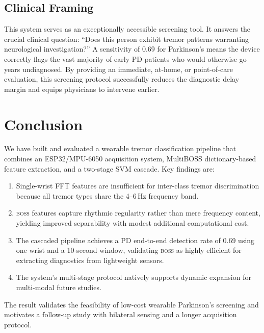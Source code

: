 \documentclass[12pt, a4paper]{article}
\newcommand{\boss}{\textsc{boss}}
\newcommand{\PD}{PD}
\begin{document}
\subsection{Clinical Framing}

This system serves as an exceptionally accessible screening tool. It answers the crucial clinical question: ``Does this person exhibit tremor patterns warranting neurological investigation?'' A sensitivity of 0.69 for Parkinson's means the device correctly flags the vast majority of early \PD{} patients who would otherwise go years undiagnosed. By providing an immediate, at-home, or point-of-care evaluation, this screening protocol successfully reduces the diagnostic delay margin and equips physicians to intervene earlier.

\section{Conclusion}
\label{sec:conclusion}

We have built and evaluated a wearable tremor classification pipeline
that combines an ESP32/MPU-6050 acquisition system, MultiBOSS
dictionary-based feature extraction, and a two-stage SVM cascade.
Key findings are:

\begin{enumerate}
  \item Single-wrist FFT features are insufficient for inter-class
        tremor discrimination because all tremor types share the
        4--6\,Hz frequency band.
  \item \boss{} features capture rhythmic regularity rather than
        mere frequency content, yielding improved separability with
        modest additional computational cost.
  \item The cascaded pipeline achieves a \PD{} end-to-end detection
        rate of 0.69 using one wrist and a 10-second window, validating \boss{} as highly efficient for extracting diagnostics from lightweight sensors.
  \item The system's multi-stage protocol natively supports dynamic expansion for multi-modal future studies.
\end{enumerate}

The result validates the feasibility of low-cost wearable Parkinson's
screening and motivates a follow-up study with bilateral sensing and
a longer acquisition protocol.
\end{document}
